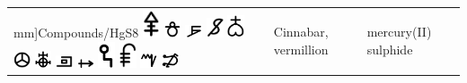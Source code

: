 \documentclass[british,final,landscape]{scrartcl}
\begin{document}
\begin{refsection}
\begin{supertabular}{p{0.3\textwidth}p{0.34\textwidth}p{0.34\textwidth}}
mm]{Compounds/HgS8} \includegraphics[width=5mm]{Compounds/HgS9} \includegraphics[width=5mm]{Compounds/HgS10} \includegraphics[width=5mm]{Compounds/HgS11} \includegraphics[width=5mm]{Compounds/HgS12} \includegraphics[width=5mm]{Compounds/HgS13} \includegraphics[width=5mm]{Compounds/HgS14} \includegraphics[width=5mm]{Compounds/HgS15} \includegraphics[width=5mm]{Compounds/HgS16} \includegraphics[width=5mm]{Compounds/HgS17} \includegraphics[width=5mm]{Compounds/HgS18} \includegraphics[width=5mm]{Compounds/HgS19} \includegraphics[width=5mm]{Compounds/HgS20} \includegraphics[width=5mm]{Compounds/HgS21} & Cinnabar, vermillion & mercury(II) sulphide   \\

\end{supertabular}
\end{refsection}
\end{document}
